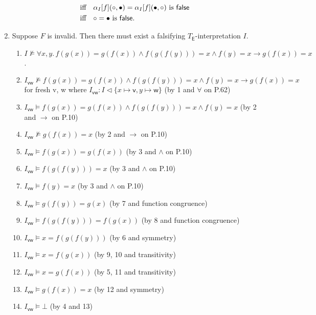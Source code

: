 \begin{exer}[3.1]
\begin{enumerate}[label=(\alph*)]
\begin{align*}
                &\text{iff}\quad \alpha_{I}[f](\circ, \bullet) = \alpha_{I}[f](\bullet, \circ) \text{ is \textsf{false}}\\
                &\text{iff}\quad \circ = \bullet \text{ is \textsf{false}}.
            \end{align*}
        \item
            Suppose $F$ is invalid. Then there must exist a falsifying $T_{\textsf{E}}$-interpretation $I$.
            \begin{enumerate}[label=\arabic*.]
                \item %
                    $I \not\models \forall x, y.\, f(g(x)) = g(f(x)) \land f(g(f(y))) = x \land f(y) = x \rightarrow g(f(x)) = x$.
                \item %
                    $I_{\textsf{vw}} \not\models f(g(x)) = g(f(x)) \land f(g(f(y))) = x \land f(y) = x \rightarrow g(f(x)) = x$ for fresh \textsf{v, w} where $I_{\textsf{vw}}: I \vartriangleleft \{ x \mapsto \textsf{v}, y \mapsto \textsf{w} \}$ (by 1 and $\forall$ on P.62)
                \item %
                    $I_{\textsf{vw}} \models f(g(x)) = g(f(x)) \land f(g(f(y))) = x \land f(y) = x$ (by 2 and $\rightarrow$ on P.10)
                \item %
                    $I_{\textsf{vw}} \not\models g(f(x)) = x$ (by 2 and $\rightarrow$ on P.10)
                \item %
                    $I_{\textsf{vw}} \models f(g(x)) = g(f(x))$ (by 3 and $\land$ on P.10)
                \item %
                    $I_{\textsf{vw}} \models f(g(f(y))) = x$ (by 3 and $\land$ on P.10)
                \item %
                    $I_{\textsf{vw}} \models f(y) = x$ (by 3 and $\land$ on P.10)
                \item %
                    $I_{\textsf{vw}} \models g(f(y)) = g(x)$ (by 7 and \textsf{function congruence})
                \item %
                    $I_{\textsf{vw}} \models f(g(f(y))) = f(g(x))$ (by 8 and \textsf{function congruence})
                \item %
                    $I_{\textsf{vw}} \models x = f(g(f(y)))$ (by 6 and \textsf{symmetry})
                \item %
                    $I_{\textsf{vw}} \models x = f(g(x))$ (by 9, 10 and \textsf{transitivity})
                \item %
                    $I_{\textsf{vw}} \models x = g(f(x))$ (by 5, 11 and \textsf{transitivity})
                \item %
                    $I_{\textsf{vw}} \models g(f(x)) = x$ (by 12 and \textsf{symmetry})
                \item %
                    $I_{\textsf{vw}} \models \bot$ (by 4 and 13)
            \end{enumerate}
    \end{enumerate}
\end{exer}
